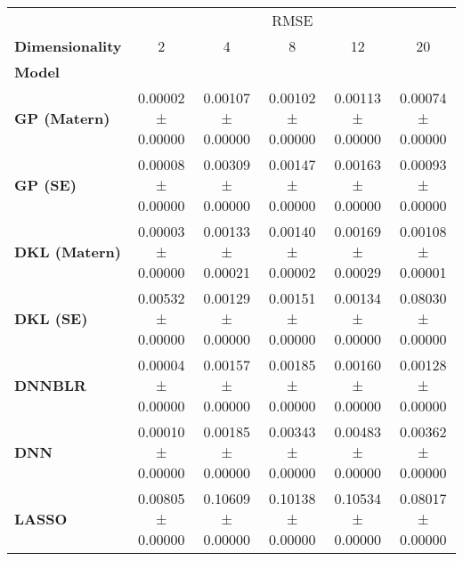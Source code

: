 \begin{tabular}{lccccc}
\toprule
{} & \multicolumn{5}{c}{RMSE} \\
\textbf{Dimensionality} &                 2  &                 4  &                 8  &                 12 &                 20 \\
\textbf{Model       } &                    &                    &                    &                    &                    \\
\midrule
\textbf{GP (Matern) } &  0.00002 ± 0.00000 &  0.00107 ± 0.00000 &  0.00102 ± 0.00000 &  0.00113 ± 0.00000 &  0.00074 ± 0.00000 \\
\textbf{GP (SE)     } &  0.00008 ± 0.00000 &  0.00309 ± 0.00000 &  0.00147 ± 0.00000 &  0.00163 ± 0.00000 &  0.00093 ± 0.00000 \\
\textbf{DKL (Matern)} &  0.00003 ± 0.00000 &  0.00133 ± 0.00021 &  0.00140 ± 0.00002 &  0.00169 ± 0.00029 &  0.00108 ± 0.00001 \\
\textbf{DKL (SE)    } &  0.00532 ± 0.00000 &  0.00129 ± 0.00000 &  0.00151 ± 0.00000 &  0.00134 ± 0.00000 &  0.08030 ± 0.00000 \\
\textbf{DNNBLR      } &  0.00004 ± 0.00000 &  0.00157 ± 0.00000 &  0.00185 ± 0.00000 &  0.00160 ± 0.00000 &  0.00128 ± 0.00000 \\
\textbf{DNN         } &  0.00010 ± 0.00000 &  0.00185 ± 0.00000 &  0.00343 ± 0.00000 &  0.00483 ± 0.00000 &  0.00362 ± 0.00000 \\
\textbf{LASSO       } &  0.00805 ± 0.00000 &  0.10609 ± 0.00000 &  0.10138 ± 0.00000 &  0.10534 ± 0.00000 &  0.08017 ± 0.00000 \\
\bottomrule
\end{tabular}
